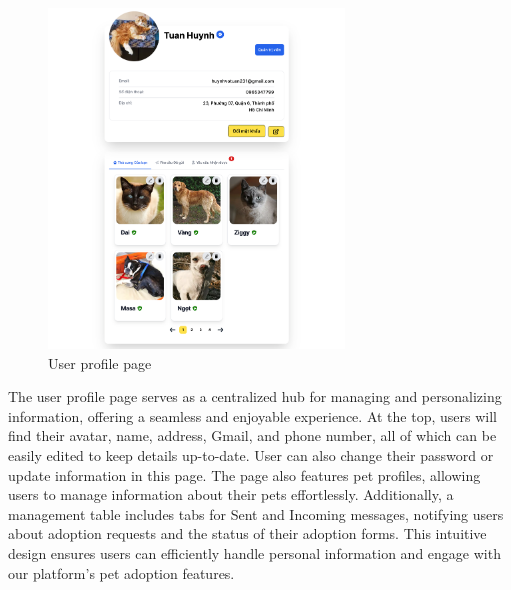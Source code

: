 \begin{figure}[H]
    \centering
    \includegraphics[width=0.7\textwidth]{Figures/UI/user_profile_ui.png}
    \caption{User profile page}
\end{figure}
The user profile page serves as a centralized hub for managing and personalizing 
information, offering a seamless and enjoyable experience. At the top, users will 
find their avatar, name, address, Gmail, and phone number, all of which can be easily 
edited to keep details up-to-date. User can also change their password or update information in this page. The page also features pet profiles, allowing 
users to manage information about their pets effortlessly. Additionally, a management
 table includes tabs for Sent and Incoming messages, notifying users about adoption
  requests and the status of their adoption forms. This intuitive design ensures 
  users can efficiently handle personal information and engage with our platform's
   pet adoption features.

